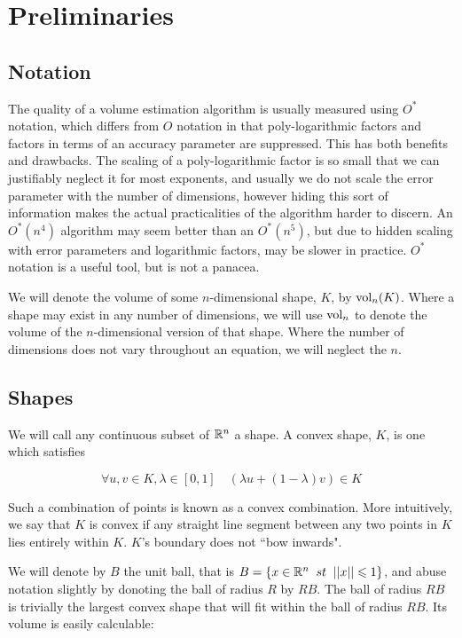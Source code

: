 \section{Preliminaries}
\subsection{Notation}

The quality of a volume estimation algorithm is usually measured using $O^{*}$ notation, which differs from $O$ notation in that poly-logarithmic factors and factors in terms of an accuracy parameter are suppressed. This has both benefits and drawbacks. The scaling of a poly-logarithmic factor is so small that we can justifiably neglect it for most exponents, and usually we do not scale the error parameter with the number of dimensions, however hiding this sort of information makes the actual practicalities of the algorithm harder to discern. An $O^{*}(n^4)$ algorithm may seem better than an $O^{*}(n^5)$, but due to hidden scaling with error parameters and logarithmic factors, may be slower in practice. $O^{*}$ notation is a useful tool, but is not a panacea.

We will denote the volume of some $n$-dimensional shape, $K$, by $\mbox{vol}_n(K)$. Where a shape may exist in any number of dimensions, we will use $\mbox{vol}_n$ to denote the volume of the $n$-dimensional version of that shape. Where the number of dimensions does not vary throughout an equation, we will neglect the $n$.

\subsection{Shapes}

We will call any continuous subset of $\mathbb{R}^{n}$ a shape. A convex shape, $K$, is one which satisfies

$$
\forall u, v \in K, \lambda \in [0,1] \quad (\lambda u + (1-\lambda) v) \in K
$$

Such a combination of points is known as a convex combination. More intuitively, we say that $K$ is convex if any straight line segment between any two points in $K$ lies entirely within $K$. $K$'s boundary does not ``bow inwards".

We will denote by $B$ the unit ball, that is $B = \{x \in \mathbb{R}^n \;\; st \;\; ||x|| \leqslant 1\}$, and abuse notation slightly by donoting the ball of radius $R$ by $RB$. The ball of radius $RB$ is trivially the largest convex shape that will fit within the ball of radius $RB$. Its volume is easily calculable:

